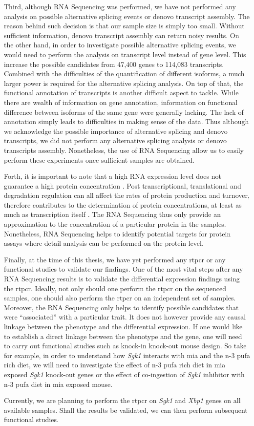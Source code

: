 Third, although RNA Sequencing was performed, we have not performed any analysis on possible alternative splicing events or denovo transcript assembly.
The reason behind such decision is that our sample size is simply too small.
Without sufficient information, denovo transcript assembly can return noisy results.
On the other hand, in order to investigate possible alternative splicing events, we would need to perform the analysis on transcript level instead of gene level. 
This increase the possible candidates from 47,400 genes to 114,083 transcripts.
Combined with the difficulties of the quantification of different isoforms, a much larger power is required for the alternative splicing analysis. 
On top of that, the functional annotation of transcripts is another difficult aspect to tackle.
While there are wealth of information on gene annotation, information on functional difference between isoforms of the same gene were generally lacking. 
The lack of annotation simply leads to difficulties in making sense of the data. 
Thus although we acknowledge the possible importance of alternative splicing and denovo transcripts, we did not perform any alternative splicing analysis or denovo transcripts assembly.
Nonetheless, the use of RNA Sequencing allow us to easily perform these experiments once sufficient samples are obtained.

Forth, it is important to note that a high RNA expression level does not guarantee a high protein concentration \citep{Vogel2012}.
Post transcriptional, translational and degradation regulation can all affect the rates of protein production and turnover, therefore contributes to the determination of protein concentrations, at least as much as transcription itself \citep{Vogel2012}.
The RNA Sequencing thus only provide an approximation to the concentration of a particular protein in the samples.
Nonetheless, RNA Sequencing helps to identify potential targets for protein assays where detail analysis can be performed on the protein level.

Finally, at the time of this thesis, we have yet performed any \gls{rtpcr} or any functional studies to validate our findings.
One of the most vital steps after any RNA Sequencing results is to validate the differential expression findings using the \gls{rtpcr}.
Ideally, not only should one perform the \gls{rtpcr} on the sequenced samples, one should also perform the \gls{rtpcr} on an independent set of samples. 
Moreover, the RNA Sequencing only helps to identify possible candidates that were ``associated'' with a particular trait.
It does not however provide any causal linkage between the phenotype and the differential expression.
If one would like to establish a direct linkage between the phenotype and the gene, one will need to carry out functional studies such as knock-in knock-out mouse design.
So take for example, in order to understand how \textit{Sgk1} interacts with \gls{mia} and the n-3 \gls{pufa} rich diet, we will need to investigate the effect of n-3 \gls{pufa} rich diet in \gls{mia} exposed \textit{Sgk1} knock-out genes or the effect of co-ingestion of \textit{Sgk1} inhibitor with n-3 \gls{pufa} diet in \gls{mia} exposed mouse.

Currently, we are planning to perform the \gls{rtpcr} on \textit{Sgk1} and \textit{Xbp1} genes on all available samples. 
Shall the results be validated, we can then perform subsequent functional studies. 